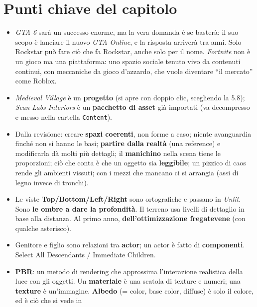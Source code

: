 \section*{Punti chiave del capitolo}

\begin{itemize}
  \item \emph{GTA 6} sarà un successo enorme, ma la vera domanda è se basterà: il
        suo scopo è lanciare il nuovo \emph{GTA Online}, e la risposta arriverà
        tra anni. Solo Rockstar può fare ciò che fa Rockstar, anche solo per il
        nome. \emph{Fortnite} non è un gioco ma una piattaforma: uno spazio sociale
        tenuto vivo da contenuti continui, con meccaniche da gioco d'azzardo, che
        vuole diventare ``il mercato'' come Roblox.
  \item \emph{Medieval Village} è un \textbf{progetto} (si apre con doppio clic,
        scegliendo la 5.8); \emph{Scan Labs Interiors} è un \textbf{pacchetto di
        asset} già importati (va decompresso e messo nella cartella
        \texttt{Content}).
  \item Dalla revisione: creare \textbf{spazi coerenti}, non forme a caso; niente
        avanguardia finché non si hanno le basi; \textbf{partire dalla realtà} (una
        reference) e modificarla dà molti più dettagli; il \textbf{manichino} nella
        scena tiene le proporzioni; ciò che conta è che un oggetto sia
        \textbf{leggibile}; un pizzico di caos rende gli ambienti vissuti; con i
        mezzi che mancano ci si arrangia (assi di legno invece di tronchi).
  \item Le viste \textbf{Top/Bottom/Left/Right} sono ortografiche e passano in
        \emph{Unlit}. Sono \textbf{le ombre a dare la profondità}. Il terreno usa
        livelli di dettaglio in base alla distanza. Al primo anno,
        \textbf{dell'ottimizzazione fregatevene} (con qualche asterisco).
  \item Genitore e figlio sono relazioni tra \textbf{actor}; un actor è fatto di
        \textbf{componenti}. Select All Descendants / Immediate Children.
  \item \textbf{PBR}: un metodo di rendering che approssima l'interazione
        realistica della luce con gli oggetti. Un \textbf{materiale} è una scatola
        di texture e numeri; una \textbf{texture} è un'immagine. \textbf{Albedo}
        (= color, base color, diffuse) è solo il colore, ed è ciò che si vede in

\end{itemize}
